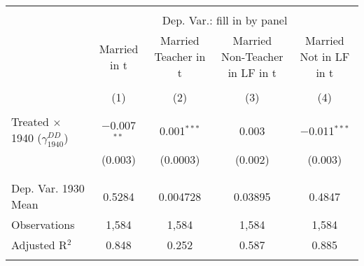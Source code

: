 
\begin{tabular}{@{\extracolsep{5pt}}lcccc} 
\\[-1.8ex]\hline 
\hline \\[-1.8ex] 
 & \multicolumn{4}{c}{Dep. Var.: fill in by panel} \\ 
\cline{2-5} 
 & Married in t & Married Teacher in t & Married Non-Teacher in LF in t & Married Not in LF in t \\ 
\\[-1.8ex] & (1) & (2) & (3) & (4)\\ 
\hline \\[-1.8ex] 
 Treated $\times$ 1940 ($\gamma_{1940}^{DD}$) & $-$0.007$^{**}$ & 0.001$^{***}$ & 0.003 & $-$0.011$^{***}$ \\ 
  & (0.003) & (0.0003) & (0.002) & (0.003) \\ 
  & & & & \\ 
\hline \\[-1.8ex] 
Dep. Var. 1930 Mean & 0.5284 & 0.004728 & 0.03895 & 0.4847 \\ 
Observations & 1,584 & 1,584 & 1,584 & 1,584 \\ 
Adjusted R$^{2}$ & 0.848 & 0.252 & 0.587 & 0.885 \\ 
\hline 
\hline \\[-1.8ex] 
\end{tabular} 
